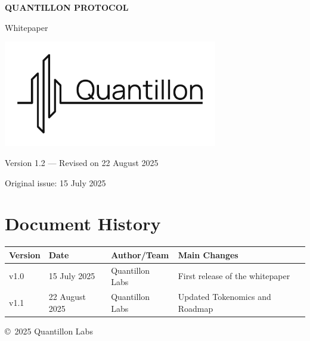 \documentclass[12pt,a4paper]{report}
\begin{document}
\begin{titlepage}
  \centering
  {\huge\bfseries QUANTILLON PROTOCOL\par}
  \vspace{1em}
  {\Large Whitepaper\par}
  \vspace*{\fill}
  \includegraphics[width=0.7\textwidth]{image1_inverted.png}\par
  \vspace*{\fill}
  {\large Version 1.2 — Revised on 22 August 2025\par}
  {\large Original issue: 15 July 2025\par}
\end{titlepage}

\section*{Document History}
\begin{tabularx}{\textwidth}{@{} l l l X @{} }
\toprule
\textbf{Version} & \textbf{Date} & \textbf{Author/Team} & \textbf{Main Changes} \\
\midrule
v1.0 & 15 July 2025 & Quantillon Labs & First release of the whitepaper \\
v1.1 & 22 August 2025 & Quantillon Labs & Updated Tokenomics and Roadmap \\
\bottomrule
\end{tabularx}
\newpage

\tableofcontents
\newpage



\vfill
\begin{center}
  \small \copyright~2025 Quantillon Labs
\end{center}
\end{document}
